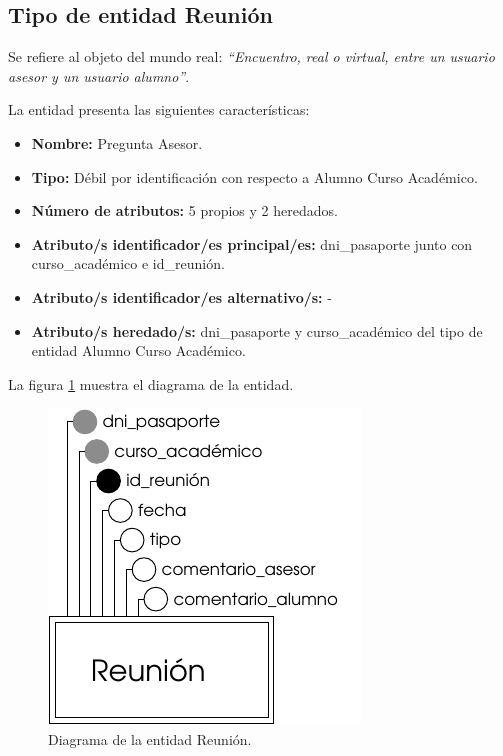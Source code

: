 \subsection{Tipo de entidad Reunión}

   \begin{description}

   \item[Definición] Se refiere al objeto del mundo real: \emph{``Encuentro,
   real o virtual, entre un usuario asesor y un usuario alumno''}.

   \item[Características] La entidad presenta las siguientes características:
      \begin{itemize}
         \item \textbf{Nombre:} Pregunta Asesor.
         \item \textbf{Tipo:} Débil por identificación con respecto a
         Alumno Curso Académico.
         \item \textbf{Número de atributos:} 5 propios y 2 heredados.
         \item \textbf{Atributo/s identificador/es principal/es:} dni\_pasaporte
         junto con curso\_académico e id\_reunión.
         \item \textbf{Atributo/s identificador/es alternativo/s:} -
         \item \textbf{Atributo/s heredado/s:} dni\_pasaporte y curso\_académico
         del tipo de entidad Alumno Curso Académico.
      \end{itemize}

   \item[Diagrama] La figura \ref{diagramaReunion} muestra el diagrama de la entidad.
   \item \begin{figure}[!ht]
            \begin{center}
            \includegraphics[]{07.Modelo_Entidad-Interrelacion/7.2.Analisis_Entidades/diagramas/reunion.pdf}
            \caption{Diagrama de la entidad Reunión.}
            \label{diagramaReunion}
            \end{center}
         \end{figure}


\end{description}
